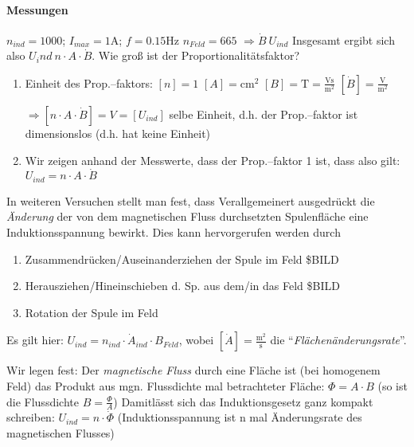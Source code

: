 \documentclass[a4paper]{scrartcl}
\begin{document}
\paragraph{Messungen}
$n_{ind} = 1000$; %
$I_{max} = 1\mathrm{A}$; %
$f=0.15\mathrm{Hz}$ %
$n_{Feld} = 665$ %
$\Rightarrow \dot{B}~U_{ind}$ %
Insgesamt ergibt sich also $U_ind ~ n \cdot A \cdot \dot{B}$. Wie groß ist der
Proportionalitätsfaktor?
\begin{enumerate}
	\item Einheit des Prop.--faktors: $[n]=1$ $[A]=\mathrm{cm^2}$ 
	$[B]=\mathrm{T}=
		\frac{\mathrm{Vs}}{\mathrm{m^2}}$ 
		$[\dot{B}]=\frac{\mathrm{V}}{\mathrm{m^2}}$
		
		$\Rightarrow [n \cdot A \cdot \dot{B}]=V=[U_{ind}]$
		selbe Einheit, d.h. der Prop.--faktor ist dimensionslos (d.h. hat keine
		Einheit)
	\item Wir zeigen anhand der Messwerte, dass der Prop.--faktor 1 ist,
		dass also gilt: $U_{ind} = n \cdot A \cdot \dot{B}$
\end{enumerate}

In weiteren Versuchen stellt man fest, dass Verallgemeinert ausgedrückt die
\emph{Änderung} der von dem magnetischen Fluss durchsetzten Spulenfläche
eine Induktionsspannung bewirkt. Dies kann hervorgerufen werden durch
\begin{enumerate}
	\item Zusammendrücken/Auseinanderziehen der Spule im Feld \$BILD %
	\item Herausziehen/Hineinschieben d. Sp. aus dem/in das Feld \$BILD %
	\item Rotation der Spule im Feld
\end{enumerate}
Es gilt hier: $U_{ind} = n_{ind} \cdot \dot{A}_{ind} \cdot B_{Feld}$,
wobei $[\dot{A}]=\frac{\mathrm{m^2}}{\mathrm{s}}$ die 
"`\emph{Flächenänderungsrate}"'. %

Wir legen fest: Der \emph{magnetische Fluss} durch eine Fläche ist (bei
homogenem Feld) das Produkt aus mgn. Flussdichte mal betrachteter Fläche:
$\Phi = A \cdot B$ (so ist die Flussdichte $B=\frac{\Phi}{A}$) %
Damitlässt sich das Induktionsgesetz ganz kompakt schreiben:
$U_{ind} = n \cdot \dot{\Phi}$ (Induktionsspannung ist n mal Änderungsrate
des magnetischen Flusses)
\end{document}
